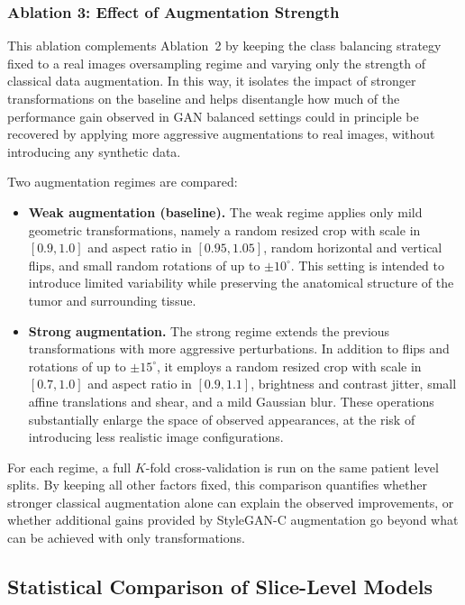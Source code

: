 \subsubsection{Ablation 3: Effect of Augmentation Strength}

This ablation complements Ablation~2 by keeping the class balancing strategy fixed to a real images oversampling regime and varying only the strength of classical data augmentation. In this way, it isolates the impact of stronger transformations on the baseline and helps disentangle how much of the performance gain observed in GAN balanced settings could in principle be recovered by applying more aggressive augmentations to real images, without introducing any synthetic data.

Two augmentation regimes are compared:

\begin{itemize}
    \item \textbf{Weak augmentation (baseline).} The weak regime applies only mild geometric transformations, namely a random resized crop with scale in $[0.9, 1.0]$ and aspect ratio in $[0.95, 1.05]$, random horizontal and vertical flips, and small random rotations of up to $\pm 10^\circ$. This setting is intended to introduce limited variability while preserving the anatomical structure of the tumor and surrounding tissue.

    \item \textbf{Strong augmentation.} The strong regime extends the previous transformations with more aggressive perturbations. In addition to flips and rotations of up to $\pm 15^\circ$, it employs a random resized crop with scale in $[0.7, 1.0]$ and aspect ratio in $[0.9, 1.1]$, brightness and contrast jitter, small affine translations and shear, and a mild Gaussian blur. These operations substantially enlarge the space of observed appearances, at the risk of introducing less realistic image configurations.



\end{itemize}

For each regime, a full $K$-fold cross-validation is run on the same patient level splits. By keeping all other factors fixed, this comparison quantifies whether stronger classical augmentation alone can explain the observed improvements, or whether additional gains provided by StyleGAN-C augmentation go beyond what can be achieved with only transformations.


\subsection{Statistical Comparison of Slice-Level Models}
\label{subsec:stat_tests_slice_level}

